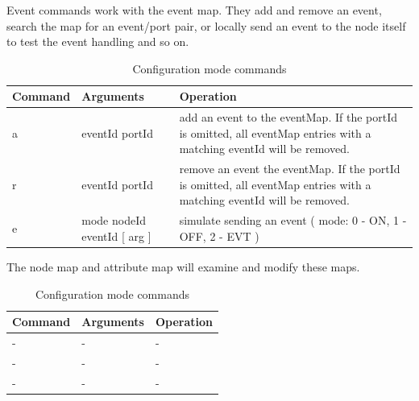 Event commands work with the event map. They add and remove an event, search the map for an event/port pair, or locally send an event to the node itself to test the event handling and so on.

\begin{table}[ht!]
    \begin{center}
        \renewcommand{\arraystretch}{1.2}
        \caption{Configuration mode commands}
        \begin{tabularx}{0.9\textwidth}{|l|l|X|}
            \hline
            \textbf{Command} & \textbf{Arguments}  & \textbf{Operation} \\
            \hline
            a & eventId portId & add an event to the eventMap. If the portId is omitted, all eventMap entries with a matching eventId will be removed.\\
            \hline
            r & eventId portId & remove an event the eventMap. If the portId is omitted, all eventMap entries with a matching eventId will be removed.\\
            \hline
            e & mode nodeId eventId [ arg ] & simulate sending an event ( mode: 0 - ON, 1 - OFF, 2 - EVT ) \\
            \hline
        \end{tabularx}
    \end{center}
\end{table}
\FloatBarrier


The node map and attribute map will examine and modify these maps.

\begin{table}[ht!]
    \begin{center}
        \renewcommand{\arraystretch}{1.2}
        \caption{Configuration mode commands}
        \begin{tabularx}{0.9\textwidth}{|l|l|X|}
            \hline
            \textbf{Command} & \textbf{Arguments}  & \textbf{Operation} \\
            \hline
            - & - & - \\
            \hline
            - & - & - \\
            \hline
            - & - & - \\
            \hline
        \end{tabularx}
    \end{center}
\end{table}
\FloatBarrier

